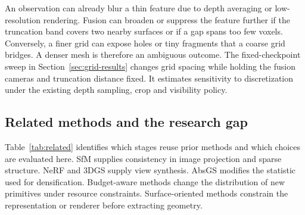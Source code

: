 An observation can already blur a thin feature due to depth averaging or low-resolution rendering. Fusion can broaden or suppress the feature further if the truncation band covers two nearby surfaces or if a gap spans too few voxels. Conversely, a finer grid can expose holes or tiny fragments that a coarse grid bridges. A denser mesh is therefore an ambiguous outcome. The fixed-checkpoint sweep in Section~\ref{sec:grid-results} changes grid spacing while holding the fusion cameras and truncation distance fixed. It estimates sensitivity to discretization under the existing depth sampling, crop and visibility policy.

\subsection{Related methods and the research gap}\label{sec:related}
Table~\ref{tab:related} identifies which stages reuse prior methods and which choices are evaluated here. SfM supplies consistency in image projection and sparse structure. NeRF and 3DGS supply view synthesis. AbsGS modifies the statistic used for densification. Budget-aware methods change the distribution of new primitives under resource constraints. Surface-oriented methods constrain the representation or renderer before extracting geometry.

